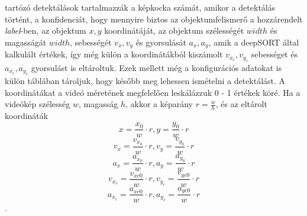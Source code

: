 \documentclass[12pt,a4paper]{article}
\begin{document}
tartózó detektálások tartalmazzák a képkocka számát, amikor a detektálás történt, a konfidenciát, hogy mennyire biztos az
objektumfelismerő a hozzárendelt \textit{label}-ben, az objektum \begin{math}x,y\end{math} koordinátáját, az objektum szélességét
\begin{math}width\end{math} és magasságát \begin{math}width\end{math}, sebességét \begin{math}v_x,v_y\end{math} és gyorsulását \begin{math}a_x,a_y\end{math},
amik a deepSORT által kalkulált értékek, így még külön a koordinátákból kiszámolt \begin{math}v_{x_c},v_{y_c}\end{math} sebességet és
\begin{math}a_{x_c},a_{y_c}\end{math} gyorsulást is eltároltuk.
Ezek mellett még a konfigurációs adatokat is külön táblában tároljuk, hogy később meg lehessen ismételni a detektálást.
A koordinátákat a videó méretének megfelelően leskálázzuk 0 - 1 értékek köré. Ha a videókép szélesség \begin{math}w\end{math}, magasság \begin{math}h\end{math},
akkor a képarány \begin{math}r = \frac{w}{h}\end{math}, és az eltárolt koordináták
\newpage
\begin{equation}x = \frac{x_0}{w} \cdot r, y = \frac{y_0}{w} \cdot r\end{equation}
\begin{equation}v_x = \frac{v_{x_0}}{w} \cdot r, v_y = \frac{v_{y_0}}{w} \cdot r\end{equation}
\begin{equation}a_x = \frac{a_{x_0}}{w} \cdot r, a_y = \frac{a_{y_0}}{w} \cdot r\end{equation}
\begin{equation}v_{x_c} = \frac{v_{xc0}}{w} \cdot r, v_{y_c} = \frac{v_{yc0}}{w} \cdot r\end{equation}
\begin{equation}a_{x_c} = \frac{a_{xc0}}{w} \cdot r, a_{y_c} = \frac{a_{yc0}}{w} \cdot r\end{equation}.
\end{document}
